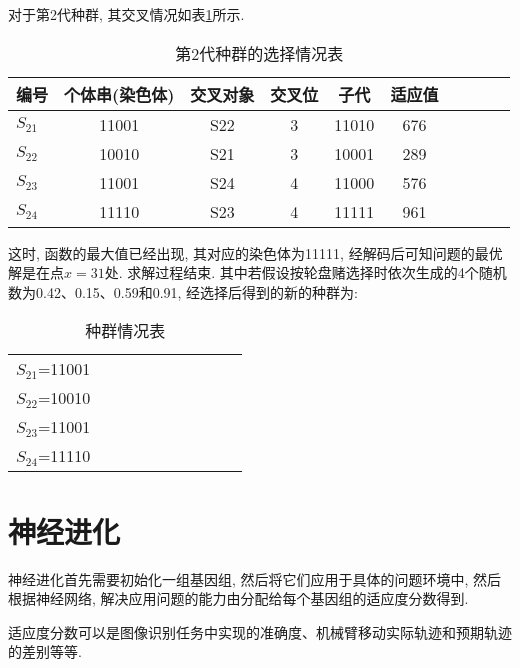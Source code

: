 对于第2代种群, 其交叉情况如表\ref{AI_table2019112810}所示.
\begin{table} [H]
\caption{第2代种群的选择情况表}
\vspace{-0.4cm}
\begin{center}
\begin{tabular} {lccccccccc}
  \hline
编号&	个体串(染色体)&	交叉对象&	交叉位&子代&适应值\\
  \hline
$S_{21}$&	11001	    &S22	&3	&11010&	676\\
$S_{22}$&	10010	    &S21    &3	&10001&	289\\
$S_{23}$&	11001	    &S24	&4	&11000&	576\\
$S_{24}$&	11110	    &S23	&4	&11111&	961\\
\hline
\end{tabular}
\end{center}
\label{AI_table2019112810}
\vspace{-0.4cm}
\end{table}
这时, 函数的最大值已经出现, 其对应的染色体为11111, 经解码后可知问题的最优解是在点$x=31$处. 求解过程结束.
其中若假设按轮盘赌选择时依次生成的4个随机数为0.42、0.15、0.59和0.91, 经选择后得到的新的种群为:
\begin{table} [H]
\caption{种群情况表}
\vspace{-0.4cm}
\begin{center}
\begin{tabular} {lccccccccc}
\hline
$S_{21}$=11001\\
$S_{22}$=10010\\
$S_{23}$=11001\\
$S_{24}$=11110\\
\hline
\end{tabular}
\end{center}
\vspace{-1.4cm}
\end{table}
\section{神经进化}
    神经进化首先需要初始化一组基因组, 然后将它们应用于具体的问题环境中, 然后根据神经网络, 解决应用问题的能力由分配给每个基因组的适应度分数得到.
\begin{newexam}
    适应度分数可以是图像识别任务中实现的准确度、机械臂移动实际轨迹和预期轨迹的差别等等.
\end{newexam}

